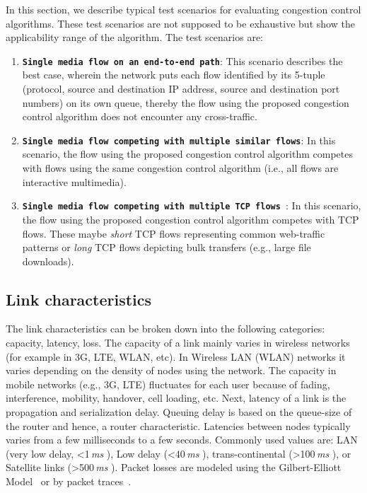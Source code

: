 In this section, we describe typical test scenarios for evaluating congestion
control algorithms. These test scenarios are not supposed to be exhaustive
but show the applicability range of the algorithm. The test scenarios are:

\begin{enumerate}
\setlength{\itemsep}{0pt}

\item \textbf{\texttt{Single media flow on an end-to-end path}}: This scenario
describes the best case, wherein the network puts each flow identified by its
5-tuple (protocol, source and destination IP address, source and destination
port numbers) on its own queue, thereby the flow using the proposed congestion
control algorithm does not encounter any cross-traffic.

\item \textbf{\texttt{Single media flow competing with multiple similar
flows}}: In this scenario, the flow using the proposed congestion control
algorithm competes with flows using the same congestion control algorithm
(i.e., all flows are interactive multimedia).


\item \textbf{\texttt{Single media flow competing with multiple TCP flows }}:
In this scenario, the flow using the proposed congestion control algorithm
competes with TCP flows. These maybe \emph{short} TCP flows representing
common web-traffic patterns or \emph{long} TCP flows depicting bulk transfers
(e.g., large file downloads).

\end{enumerate}





\subsection{Link characteristics}

The link characteristics can be broken down into the following categories:
capacity, latency, loss. The capacity of a link mainly varies in wireless
networks (for example in 3G, LTE, WLAN, etc). In Wireless LAN (WLAN) networks
it varies depending on the density of nodes using the network. The capacity in
mobile networks (e.g., 3G, LTE) fluctuates for each user because of fading,
interference, mobility, handover, cell loading, etc. Next, latency of a link
is the propagation and serialization delay. Queuing delay is based on the
queue-size of the router and hence, a router characteristic. Latencies between
nodes typically varies from a few milliseconds to a few seconds. Commonly used
values are: LAN (very low delay, <1\,\emph{ms} ), Low delay (<40\,\emph{ms} ),
trans-continental (>100\,\emph{ms} ), or Satellite links (>500\,\emph{ms} ).
Packet losses are modeled using the Gilbert-Elliott
Model~\cite{gilbert1960capacity, elliott1963estimates} or by packet
traces~\cite{ellis:2011:dataset, 3gppSim}.


